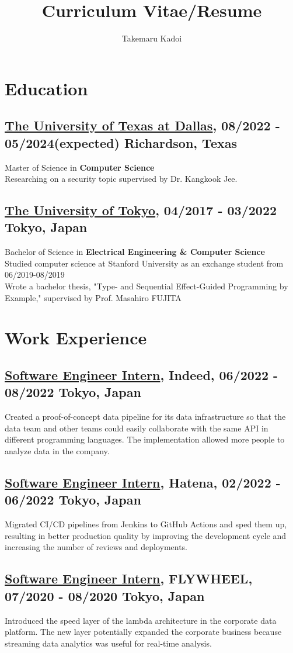 \documentclass[10pt]{article}
\title{\vspace{-1cm}Curriculum Vitae/Resume}
\author{Takemaru Kadoi}
\date{}
\begin{document}
\section*{Education}
  \subsection*{\underline{The University of Texas at Dallas}, 08/2022 - 05/2024(expected) \hfill Richardson, Texas}
    Master of Science in \textbf{Computer Science}
    \\
    Researching on a security topic supervised by Dr. Kangkook Jee.

  \subsection*{\underline{The University of Tokyo}, 04/2017 -  03/2022 \hfill Tokyo, Japan}
    Bachelor of Science in \textbf{Electrical Engineering \& Computer Science}
    \\
    Studied computer science at Stanford University as an exchange student from 06/2019-08/2019
    \\
    Wrote a bachelor thesis, "Type- and Sequential Effect-Guided Programming by Example," supervised by Prof. Masahiro FUJITA

\section*{Work Experience}
  \subsection*{\underline{Software Engineer Intern}, Indeed, 06/2022 - 08/2022 \hfill Tokyo, Japan}
    Created a proof-of-concept data pipeline for its data infrastructure so that the data team and other teams could easily collaborate with the same API in different programming languages.
    The implementation allowed more people to analyze data in the company.
  \subsection*{\underline{Software Engineer Intern}, Hatena, 02/2022 - 06/2022 \hfill Tokyo, Japan}
    Migrated CI/CD pipelines from Jenkins to GitHub Actions and sped them up, resulting in better production quality by improving the development cycle and increasing the number of reviews and deployments.
  \subsection*{\underline{Software Engineer Intern}, FLYWHEEL, 07/2020 - 08/2020 \hfill Tokyo, Japan}
    Introduced the speed layer of the lambda architecture in the corporate data platform.
    The new layer potentially expanded the corporate business because streaming data analytics was useful for real-time analysis.
\end{document}
